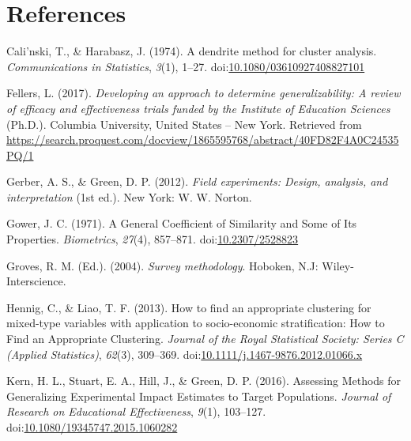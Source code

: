 \documentclass[man,floatsintext]{apa6}
\begin{document}
\hypertarget{references}{%
\section{References}\label{references}}

\begingroup
\setlength{\parindent}{-0.5in}
\setlength{\leftskip}{0.5in}

\hypertarget{refs}{}
\leavevmode\hypertarget{ref-calinskiDendriteMethodCluster1974}{}%
Cali\a'nski, T., \& Harabasz, J. (1974). A dendrite method for cluster analysis. \emph{Communications in Statistics}, \emph{3}(1), 1--27. doi:\href{https://doi.org/10.1080/03610927408827101}{10.1080/03610927408827101}

\leavevmode\hypertarget{ref-fellersDevelopingApproachDetermine2017}{}%
Fellers, L. (2017). \emph{Developing an approach to determine generalizability: A review of efficacy and effectiveness trials funded by the Institute of Education Sciences} (Ph.D.). Columbia University, United States -- New York. Retrieved from \url{https://search.proquest.com/docview/1865595768/abstract/40FD82F4A0C24535PQ/1}

\leavevmode\hypertarget{ref-gerberFieldExperimentsDesign2012}{}%
Gerber, A. S., \& Green, D. P. (2012). \emph{Field experiments: Design, analysis, and interpretation} (1st ed.). New York: W. W. Norton.

\leavevmode\hypertarget{ref-gowerGeneralCoefficientSimilarity1971}{}%
Gower, J. C. (1971). A General Coefficient of Similarity and Some of Its Properties. \emph{Biometrics}, \emph{27}(4), 857--871. doi:\href{https://doi.org/10.2307/2528823}{10.2307/2528823}

\leavevmode\hypertarget{ref-grovesSurveyMethodology2004}{}%
Groves, R. M. (Ed.). (2004). \emph{Survey methodology}. Hoboken, N.J: Wiley-Interscience.

\leavevmode\hypertarget{ref-hennigHowFindAppropriate2013}{}%
Hennig, C., \& Liao, T. F. (2013). How to find an appropriate clustering for mixed-type variables with application to socio-economic stratification: How to Find an Appropriate Clustering. \emph{Journal of the Royal Statistical Society: Series C (Applied Statistics)}, \emph{62}(3), 309--369. doi:\href{https://doi.org/10.1111/j.1467-9876.2012.01066.x}{10.1111/j.1467-9876.2012.01066.x}

\leavevmode\hypertarget{ref-kernAssessingMethodsGeneralizing2016}{}%
Kern, H. L., Stuart, E. A., Hill, J., \& Green, D. P. (2016). Assessing Methods for Generalizing Experimental Impact Estimates to Target Populations. \emph{Journal of Research on Educational Effectiveness}, \emph{9}(1), 103--127. doi:\href{https://doi.org/10.1080/19345747.2015.1060282}{10.1080/19345747.2015.1060282}
\end{document}

